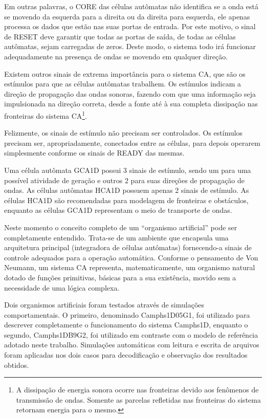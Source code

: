 Em outras palavras, o CORE das células autômatas não identifica se a onda está se movendo da esquerda para a direita ou da direita para esquerda, ele apenas processa os dados que estão nas suas portas de entrada. Por este motivo, o sinal de RESET deve garantir que todas as portas de saída, de todas as células autômatas, sejam carregadas de zeros. Deste modo, o sistema todo irá funcionar adequadamente na presença de ondas se movendo em qualquer direção.

Existem outros sinais de extrema importância para o sistema CA, que são os estímulos para que as células autômatas trabalhem. Os estímulos indicam a direção de propagação das ondas sonoras, fazendo com que uma informação seja impulsionada na direção correta, desde a fonte até à sua completa dissipação nas fronteiras do sistema CA\footnote{A dissipação de energia sonora ocorre nas fronteiras devido aos fenômenos de transmissão de ondas. Somente as parcelas refletidas nas fronteiras do sistema retornam energia para o mesmo.}.

Felizmente, os sinais de estímulo não precisam ser controlados. Os estímulos precisam ser, apropriadamente, conectados entre as células, para depois operarem simplesmente conforme os sinais de READY das mesmas.

Uma célula autômata GCA1D possui 3 sinais de estímulo, sendo um para uma possível atividade de geração e outros 2 para suas direções de propagação de ondas. As células autômatas HCA1D possuem apenas 2 sinais de estímulo. As células HCA1D são recomendadas para modelagem de fronteiras e obstáculos, enquanto as células GCA1D representam o meio de transporte de ondas.

Neste momento o conceito completo de um ``organismo artificial'' pode ser completamente entendido. Trata-se de um ambiente que encapsula uma arquitetura principal (integradora de células autômatas) fornecendo-a sinais de controle adequados para a operação automática. Conforme o pensamento de Von Neumann, um sistema CA representa, matematicamente, um organismo natural dotado de funções primitivas, básicas para a sua existência, movido sem a necessidade de uma lógica complexa. 

Dois organismos artificiais foram testados através de simulações comportamentais. O primeiro, denominado Camphs1D05G1, foi utilizado para descrever completamente o funcionamento do sistema Camphs1D, enquanto o segundo, Camphs1DB9G2, foi utilizado em contraste com o modelo de referência adotado neste trabalho. Simulações automáticas com leitura e escrita de arquivos foram aplicadas nos dois casos para decodificação e observação dos resultados obtidos.

